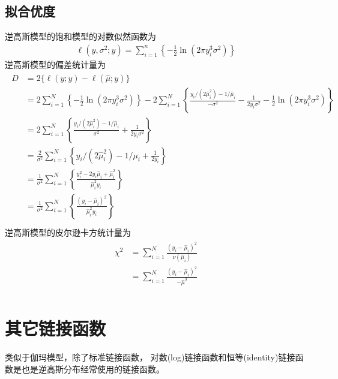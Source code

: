 \documentclass[letterpaper,10pt,english]{sphinxmanual}
\begin{document}
\subsection{拟合优度}
\label{\detokenize{_u9006_u9ad8_u65af_u6a21_u578b/content:id6}}
逆高斯模型的饱和模型的对数似然函数为
\begin{equation}\label{equation:逆高斯模型/content:逆高斯模型/content:14}
\begin{split}    \ell(y,\sigma^2;y)= \sum_{i=1}^n  \left \{
- \frac{ 1}{2 } \ln \left( 2\pi y^3_i \sigma^2 \right)
\right \}\end{split}
\end{equation}
逆高斯模型的偏差统计量为
\begin{align}\label{equation:逆高斯模型/content:逆高斯模型/content:15}\!\begin{aligned}
D &= 2 \{ \ell(y;y)  - \ell(\hat{\mu};y)\}\\
&= 2\sum_{i=1}^N  \left \{
- \frac{ 1}{2 } \ln \left( 2\pi y^3_i \sigma^2 \right)
\right \}
-
2\sum_{i=1}^N  \left \{
\frac{ y_i/(2\hat{\mu}^2_i) -1/\hat{\mu}_i}{-\sigma^2}
- \frac{1}{2y_i\sigma^2}
- \frac{ 1}{2 } \ln \left( 2\pi y^3_i \sigma^2 \right)
\right \}\\
&= 2\sum_{i=1}^N  \left \{
\frac{ y_i/(2\hat{\mu}^2_i) -1/\hat{\mu}_i}{\sigma^2}
+ \frac{1}{2y_i\sigma^2}
\right \}\\
&= \frac{2}{\sigma^2} \sum_{i=1}^N  \left \{
 y_i/(2\hat{\mu}^2_i) -1/\mu_i
+ \frac{1}{2y_i}
\right \}\\
&= \frac{1}{\sigma^2} \sum_{i=1}^N  \left \{
 \frac{y_i^2-2y_i\hat{\mu}_i+\hat{\mu}_i^2}{\hat{\mu}_i^2 y_i}
\right \}\\
&= \frac{1}{\sigma^2} \sum_{i=1}^N  \left \{
 \frac{ (y_i-\hat{\mu}_i)^2}{\hat{\mu}_i^2 y_i}
\right \}\\
\end{aligned}\end{align}
逆高斯模型的皮尔逊卡方统计量为
\begin{align}\label{equation:逆高斯模型/content:逆高斯模型/content:16}\!\begin{aligned}
\chi^2
&= \sum_{i=1}^N \frac{ (y_i-\hat{\mu}_i)^2}{\nu(\hat{\mu}_i)}\\
&= \sum_{i=1}^N \frac{ (y_i-\hat{\mu}_i)^2}{-\hat{\mu}^3}\\
\end{aligned}\end{align}

\section{其它链接函数}
\label{\detokenize{_u9006_u9ad8_u65af_u6a21_u578b/content:id7}}
类似于伽玛模型，除了标准链接函数，
对数(log)链接函数和恒等(identity)链接函数是也是逆高斯分布经常使用的链接函数。
\end{document}

